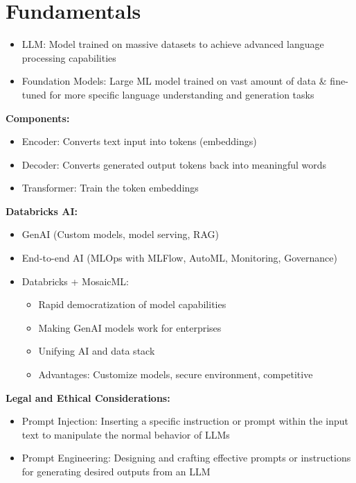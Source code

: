 \documentclass[11pt]{scrartcl}
\begin{document}
\tableofcontents

\newpage
\section{Fundamentals}
\begin{itemize}
	\item LLM: Model trained on massive datasets to achieve advanced language processing capabilities
	\item Foundation Models: Large ML model trained on vast amount of data \& fine-tuned for more specific language understanding and generation tasks 
\end{itemize}

\textbf{Components: }
\begin{itemize}
	\item Encoder: Converts text input into tokens (embeddings)
	\item Decoder: Converts generated output tokens back into meaningful words
	\item Transformer: Train the token embeddings
\end{itemize}

\textbf{Databricks AI:}
\begin{itemize}
	\item GenAI (Custom models, model serving, RAG)
	\item End-to-end AI (MLOps with MLFlow, AutoML, Monitoring, Governance)
	\item Databricks + MosaicML:
	\begin{itemize}
		\item Rapid democratization of model capabilities
		\item Making GenAI models work for enterprises
		\item Unifying AI and data stack
		\item Advantages: Customize models, secure environment, competitive
	\end{itemize}
\end{itemize}

\textbf{Legal and Ethical Considerations:}
\begin{itemize}
	\item Prompt Injection: Inserting a specific instruction or prompt within the input text to manipulate the normal behavior of LLMs
	\item Prompt Engineering: Designing and crafting effective prompts or instructions for generating desired outputs from an LLM
\end{itemize}
\end{document}
